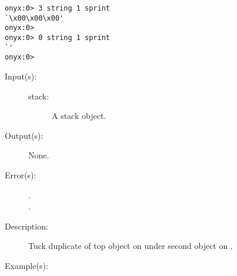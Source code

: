 \begin{description}
\begin{description}
\begin{verbatim}
onyx:0> 3 string 1 sprint
`\x00\x00\x00'
onyx:0>
onyx:0> 0 string 1 sprint
`'
onyx:0>
		\end{verbatim}
	\end{description}
\label{systemdict:stuck}
\item[{\onyxop{stack}{stuck}{--}}: ]
	\begin{description}\item[]
	\item[Input(s): ]
		\begin{description}\item[]
		\item[stack: ]
			A stack object.
		\end{description}
	\item[Output(s): ] None.
	\item[Error(s): ]
		\begin{description}\item[]
		\item[.]
		\item[.]
		\end{description}
	\item[Description: ]
		Tuck duplicate of top object on  under second
		object on .
	\item[Example(s): ]\begin{verbatim}


\end{verbatim}
\end{description}
\end{description}
